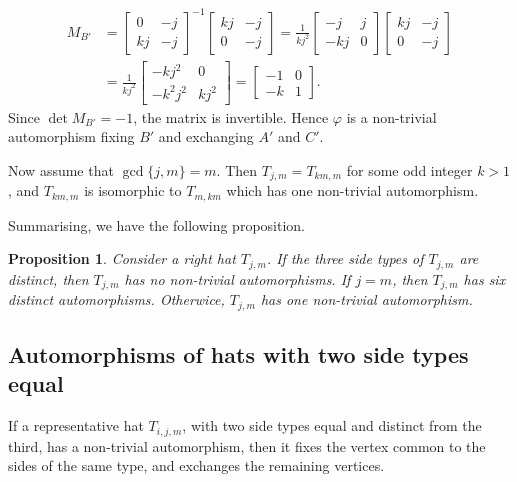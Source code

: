 \documentclass[12pt]{amsart}
\def\p{\varphi}
\theoremstyle{plain}
\newtheorem{proposition}[theorem]{Proposition}
\theoremstyle{definition}
\numberwithin{equation}{section}
\begin{document}
\begin{align*}
M_{B'} &=
	\begin{bmatrix}
		0&-j\\
		kj&-j
	\end{bmatrix}^{-1}
	\begin{bmatrix}
		kj&-j\\
		0&-j
	\end{bmatrix}
	= \frac{1}{kj^2}	\begin{bmatrix}
		-j&j\\
		-kj&0
	\end{bmatrix}
	\begin{bmatrix}
		kj&-j\\
		0&-j
	\end{bmatrix}\\ &= \frac{1}{kj^2}	\begin{bmatrix}
	-kj^2&0\\
	-k^2 j^2&kj^2
\end{bmatrix}= 	\begin{bmatrix}
 -1&0\\
-k& 1
\end{bmatrix}
.
\end{align*}
Since $\det M_{B'} = -1$, the matrix is invertible. Hence $\p$ is a non-trivial automorphism fixing $B'$ and exchanging $A'$ and $C'$.

Now assume that $\gcd\{j,m\} = m$. Then $T_{j,m} = T_{km,m}$ for some odd integer $k > 1$, and
$T_{km,m}$ is isomorphic to $T_{m,km}$ which has one non-trivial automorphism.

Summarising, we have the following proposition.



\begin{proposition}
Consider a right hat $T_{j,m}$. If the three side types of $T_{j,m}$ are distinct, then
$T_{j,m}$ has no non-trivial automorphisms. If $j = m$, then $T_{j,m}$ has six distinct
automorphisms. Otherwice, $T_{j,m}$ has one non-trivial automorphism.
\end{proposition}


\subsection{Automorphisms of hats with two side types equal}



If a representative hat $T_{i,j,m}$, with two side types equal and distinct from the third, has a
non-trivial automorphism, then it fixes the vertex common to the sides of the same type, and
exchanges the remaining vertices.
\end{document}
